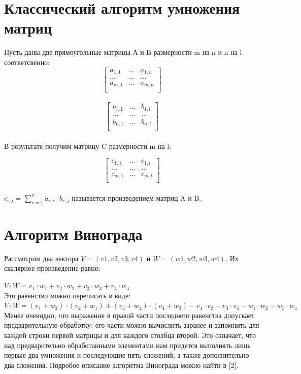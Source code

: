 \documentclass[12pt]{report}
\begin{document}
\section{Классический алгоритм умножения матриц}
Пусть даны две прямоугольные матрицы А и В размерности m на n и n на l соответсвенно: 
\[ \begin{bmatrix}
a_{1,1} & ... & a_{1,n} \\
... & ... & ... \\
a_{m,1} & ... & a_{m,n} \\
\end{bmatrix} \]\\

\[ \begin{bmatrix}
b_{1,1} & ... & b_{1,l} \\
... & ... & ... \\
b_{n,1} & ... & b_{n,l} \\
\end{bmatrix} \]\\

В результате получим матрицу C размерности m на l:
	
\[ \begin{bmatrix}
c_{1,1} & ... & c_{1,l} \\
... & ... & ... \\
c_{m,1} & ... & c_{m,l} \\
\end{bmatrix} \]\\


$c_{i,j} = \sum\limits_{r=1}^n a_{i,r}\cdot b_{r,j}$ называется произведением матриц A и B.


\section{Алгоритм Винограда}
Рассмотрим два вектора $V = (v1, v2, v3, v4)$ и $W = (w1, w2, w3, w4)$. Их скалярное произведение равно: 

$ V \cdot W=v_1 \cdot w_1 + v_2 \cdot w_2 + v_3 \cdot w_3 + v_4 \cdot w_4$ \\

Это равенство можно переписать в виде: \\
$V \cdot W=(v_1 + w_2) \cdot (v_2 + w_1) + (v_3 + w_4) \cdot (v_4 + w_3) - v_1 \cdot v_2 - v_3 \cdot v_4 - w_1 \cdot w_2 - w_3 \cdot w_4$\\

Менее очевидно, что выражение в правой части последнего равенства допускает предварительную обработку: его части можно вычислить заранее и запомнить для каждой строки первой матрицы и для каждого столбца второй. 
Это означает, что над предварительно обработанными элементами нам придется выполнять лишь первые два умножения и последующие пять сложений, а также дополнительно два сложения. Подробое описание алгоритма Винограда можно найти в [2].
\end{document}
